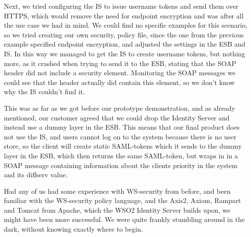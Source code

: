     Next, we tried configuring the IS to issue username tokens and send them over HTTPS, which would remove the need for endpoint encryption and was after all the use case we had in mind. We could find no specific examples for this scenario, so we tried creating our own security, policy file, since the one from the previous example specified endpoint encryption, and adjusted the settings in the ESB and IS. In this way we managed to get the IS to create username tokens, but nothing more, as it crashed when trying to send it to the ESB, stating that the SOAP header did not include a security element. Monitoring the SOAP messages we could see that the header actually did contain this element, so we don't know why the IS couldn't find it.

    This was as far as we got before our prototype demonstration, and as already mentioned, our customer agreed that we could drop the Identity Server and instead use a dummy layer in the ESB. This means that our final product does not use the IS, and users cannot log on to the system because there is no user store, so the client will create static SAML-tokens which it sends to the dummy layer in the ESB, which then returns the same SAML-token, but wraps in in a SOAP message containing information about the clients priority in the system and its diffserv value.

    Had any of us had some experience with WS-security from before, and been familiar with the WS-security policy language, and the Axis2, Axiom, Rampart and Tomcat from Apache, which the WSO2 Identity Server builds upon,  we might have been more successful. We were quite frankly stumbling around in the dark, without knowing exactly where to begin.





